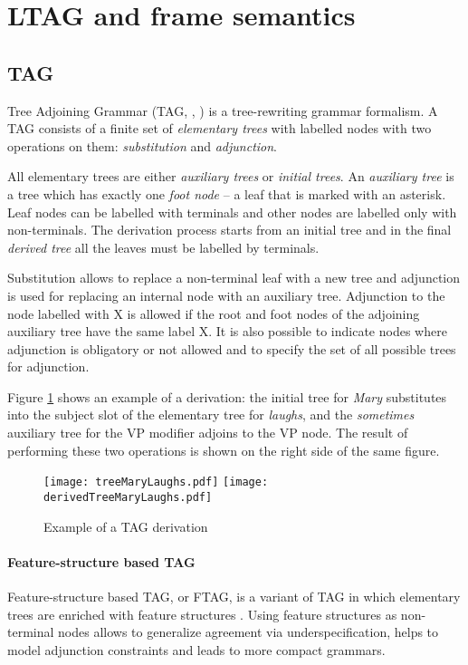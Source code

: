 \section{LTAG and frame semantics}
\subsection{TAG}\label{section:tag}
Tree Adjoining Grammar (TAG, \citealt{JoshiSchabes:97}, \citealt{AbeilleRambow:00}) is a tree-rewriting grammar formalism. A TAG consists of a finite set of \textit{elementary trees} with labelled nodes with two operations on them: \textit{substitution} and \textit{adjunction}. 

All elementary trees are either \textit{auxiliary trees} or \textit{initial trees}. An \textit{auxiliary tree} is a tree which has exactly one \textit{foot node} -- a leaf that is marked with an asterisk. Leaf nodes can be labelled with terminals and other nodes are labelled only with non-terminals. The derivation process starts from an initial tree and in the final \textit{derived tree} all the leaves must be labelled by terminals.

Substitution allows to replace a non-terminal leaf with a new tree and adjunction is used for replacing an internal node with an auxiliary tree. Adjunction to the node labelled with X is allowed if the root and foot nodes of the adjoining auxiliary tree have the same label X. It is also possible to indicate nodes where adjunction is obligatory or not allowed and to specify the set of all possible trees for adjunction.

Figure \ref{fig:exampletree} shows an example of a derivation: the initial tree for \textit{Mary} substitutes into the subject slot of the elementary tree for \textit{laughs}, and the \textit{sometimes} auxiliary tree for the VP modifier adjoins to the VP node. The result of performing these two operations is shown on the right side of the same figure.

\begin{figure}[h!]
	\centering
	\hspace{-0.6cm}    
    \texttt{[image: treeMaryLaughs.pdf]} 
    \hspace{0.4cm}
    \texttt{[image: derivedTreeMaryLaughs.pdf]} 
    \caption{Example of a TAG derivation}
    \label{fig:exampletree}
\end{figure}

\paragraph*{Feature-structure based TAG} Feature-structure based TAG, or FTAG, is a variant of TAG in which elementary trees are enriched with feature structures \citep{Vijay-ShankerJoshi:88}. Using feature structures as non-terminal nodes allows to generalize agreement via underspecification, helps to model adjunction constraints and leads to more compact grammars.

